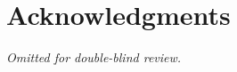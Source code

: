 \documentclass[twocolumn,10pt]{article}
\begin{document}

\section*{Acknowledgments}

\emph{Omitted for double-blind review.}




\end{document}
